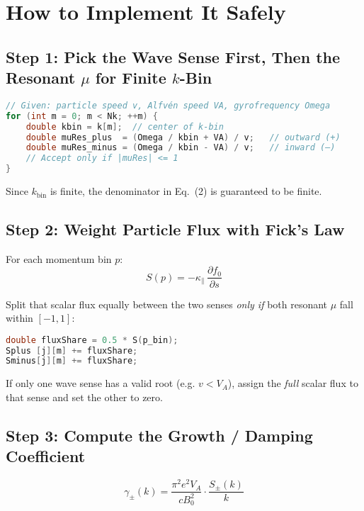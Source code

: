 \section*{How to Implement It Safely}

\subsection*{Step 1: Pick the Wave Sense First, Then the Resonant $\mu$ for Finite $k$-Bin}

\begin{lstlisting}[language=C++,basicstyle=\ttfamily\small]
// Given: particle speed v, Alfvén speed VA, gyrofrequency Omega
for (int m = 0; m < Nk; ++m) {
    double kbin = k[m];  // center of k-bin
    double muRes_plus  = (Omega / kbin + VA) / v;   // outward (+)
    double muRes_minus = (Omega / kbin - VA) / v;   // inward (–)
    // Accept only if |muRes| <= 1
}
\end{lstlisting}

Since $k_{\text{bin}}$ is finite, the denominator in Eq.~(2) is guaranteed to be finite.

\subsection*{Step 2: Weight Particle Flux with Fick’s Law}

For each momentum bin $p$:
\[
S(p) = -\kappa_\parallel \, \frac{\partial f_0}{\partial s}
\]

Split that scalar flux equally between the two senses \emph{only if} both resonant $\mu$ fall within $[-1,1]$:
\begin{lstlisting}[language=C++,basicstyle=\ttfamily\small]
double fluxShare = 0.5 * S(p_bin);
Splus [j][m] += fluxShare;
Sminus[j][m] += fluxShare;
\end{lstlisting}

If only one wave sense has a valid root (e.g. $v < V_A$), assign the \emph{full} scalar flux to that sense and set the other to zero.

\subsection*{Step 3: Compute the Growth / Damping Coefficient}

\begin{equation}
\boxed{
\gamma_\pm(k) = 
\frac{\pi^{2} e^{2} V_A}{c B_0^{2}} \cdot \frac{S_\pm(k)}{k}
}
\tag{3}
\end{equation}

